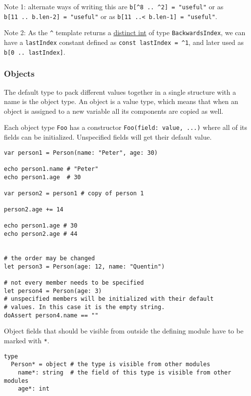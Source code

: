 Note 1: alternate ways of writing this are
\texttt{b{[}\^{}8\ ..\ \^{}2{]}\ =\ "useful"} or as
\texttt{b{[}11\ ..\ b.len-2{]}\ =\ "useful"} or as
\texttt{b{[}11\ ..\textless{}\ b.len-1{]}\ =\ "useful"}.

Note 2: As the \texttt{\^{}} template returns a
\href{manual.html\#types-distinct-type}{distinct int} of type
\texttt{BackwardsIndex}, we can have a \texttt{lastIndex} constant
defined as \texttt{const\ lastIndex\ =\ \^{}1}, and later used as
\texttt{b{[}0\ ..\ lastIndex{]}}.

\hypertarget{objects}{%
\subsubsection{Objects}\label{objects}}

The default type to pack different values together in a single structure
with a name is the object type. An object is a value type, which means
that when an object is assigned to a new variable all its components are
copied as well.

Each object type \texttt{Foo} has a constructor
\texttt{Foo(field:\ value,\ ...)} where all of its fields can be
initialized. Unspecified fields will get their default value.

\begin{verbatim}
var person1 = Person(name: "Peter", age: 30)

echo person1.name # "Peter"
echo person1.age  # 30

var person2 = person1 # copy of person 1

person2.age += 14

echo person1.age # 30
echo person2.age # 44


# the order may be changed
let person3 = Person(age: 12, name: "Quentin")

# not every member needs to be specified
let person4 = Person(age: 3)
# unspecified members will be initialized with their default
# values. In this case it is the empty string.
doAssert person4.name == ""
\end{verbatim}

Object fields that should be visible from outside the defining module
have to be marked with \texttt{*}.

\begin{verbatim}
type
  Person* = object # the type is visible from other modules
    name*: string  # the field of this type is visible from other modules
    age*: int
\end{verbatim}

